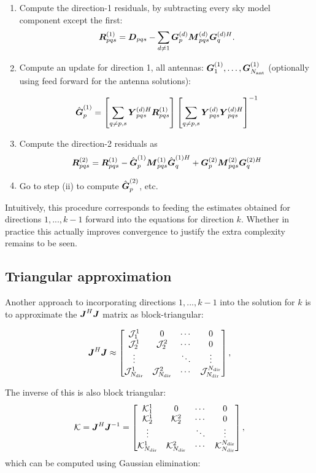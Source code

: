 \documentclass[useAMS,usenatbib]{mn2e}
\newcommand{\mat}[1]{{\bmath{#1}}}
\newcommand{\JJ}{\mat{J}} %
\newcommand{\DD}{\mat{D}}
\newcommand{\MM}{\mat{M}}
\newcommand{\RR}{\mat{R}}
\newcommand{\GG}{\mat{G}}
\newcommand{\JHJ}{\JJ^H\JJ} %
\begin{document}
\begin{enumerate}
\item Compute the direction-1 residuals, by subtracting every sky model component except the first:
\[
  \RR^{(1)}_{pqs} = \DD_{pqs} - \sum\limits_{d\ne1} \GGd_p \MMd_{pqs} \GGdH_q .
\]
\item Compute an update for direction 1, all antennas: $\GG^{(1)}_1,\dots,\GG^{(1)}_{\Na}$ (optionally using feed forward
for the antenna solutions):

\[
\hat{\GG}^{(1)}_p = \left [ \sum\limits_{q\ne p,s} \YYdH_{pqs} \RR^{(1)}_{pqs} \right ] 
\left [ \sum\limits_{q\ne p,s} \YYd_{pqs} \YYdH_{pqs}  \right ]^{-1}
\]

\item Compute the direction-2 residuals as
\[
  \RR^{(2)}_{pqs} = \RR^{(1)}_{pqs} - \hat{\GG}^{(1)}_p \MM^{(1)}_{pqs} \hat{\GG}^{(1)H}_q + \GG^{(2)}_p \MM^{(2)}_{pqs} \GG^{(2)H}_q
\]

\item Go to step (ii) to compute $\hat{\GG}^{(2)}_p$, etc.

\end{enumerate}

Intuitively, this procedure corresponds to feeding the estimates obtained for directions $1,...,k-1$ forward into the 
equations for direction $k$. Whether in practice this actually improves convergence to justify the extra complexity remains to be seen.

\subsection{Triangular approximation}

Another approach to incorporating directions $1,...,k-1$ into the solution for $k$ is to approximate the $\JHJ$ matrix as
block-triangular:

\begin{equation}
\label{eq:JHJ:DD:block-triag}
\JHJ \approx \Matrix{cccc}{
\JJJ^1_1 & 0 & \cdots & 0 \\
\JJJ^1_2 & \JJJ^2_2 & \cdots & 0 \\
\vdots & & \ddots &  \vdots \\
\JJJ_{\Nd}^1 & \JJJ_{\Nd}^2 & \cdots & \JJJ_{\Nd}^{\Nd} },
\end{equation}

\newcommand{\KKK}{\mathcal{K}}

The inverse of this is also block triangular:
\begin{equation}
\label{eq:JHJ:DD:block-triag-inv}
\KKK = \JHJ^{-1} = \Matrix{cccc}{
\KKK^1_1 & 0 & \cdots & 0 \\
\KKK^1_2 & \KKK^2_2 & \cdots & 0 \\
\vdots & & \ddots &  \vdots \\
\KKK_{\Nd}^1 & \KKK_{\Nd}^2 & \cdots & \KKK_{\Nd}^{\Nd} },
\end{equation}
which can be computed using Gaussian elimination:
\end{document}
